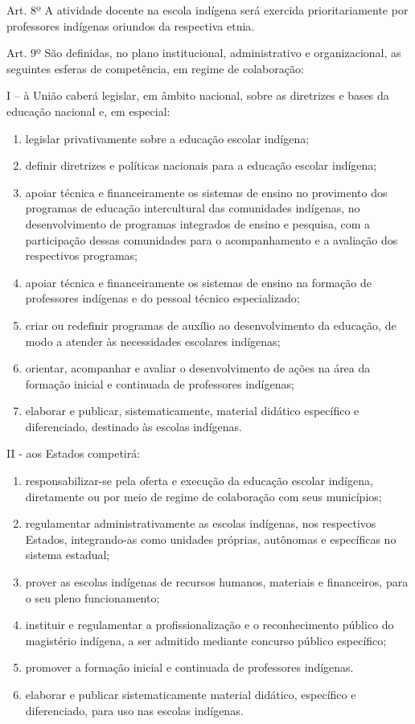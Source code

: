 \documentclass[
]{book}
\begin{document}
Art. 8º A atividade docente na escola indígena será exercida prioritariamente por professores indígenas oriundos da respectiva etnia.

Art. 9º São definidas, no plano institucional, administrativo e organizacional, as seguintes esferas de competência, em regime de colaboração:

I -- à União caberá legislar, em âmbito nacional, sobre as diretrizes e bases da educação nacional e, em especial:

\begin{enumerate}
\def\labelenumi{\alph{enumi})}
\item
  legislar privativamente sobre a educação escolar indígena;
\item
  definir diretrizes e políticas nacionais para a educação escolar indígena;
\item
  apoiar técnica e financeiramente os sistemas de ensino no provimento dos programas de educação intercultural das comunidades indígenas, no desenvolvimento de programas integrados de ensino e pesquisa, com a participação dessas comunidades para o acompanhamento e a avaliação dos respectivos programas;
\item
  apoiar técnica e financeiramente os sistemas de ensino na formação de professores indígenas e do pessoal técnico especializado;
\item
  criar ou redefinir programas de auxílio ao desenvolvimento da educação, de modo a atender às necessidades escolares indígenas;
\item
  orientar, acompanhar e avaliar o desenvolvimento de ações na área da formação inicial e continuada de professores indígenas;
\item
  elaborar e publicar, sistematicamente, material didático específico e diferenciado, destinado às escolas indígenas.
\end{enumerate}

II - aos Estados competirá:

\begin{enumerate}
\def\labelenumi{\alph{enumi})}
\item
  responsabilizar-se pela oferta e execução da educação escolar indígena, diretamente ou por meio de regime de colaboração com seus municípios;
\item
  regulamentar administrativamente as escolas indígenas, nos respectivos Estados, integrando-as como unidades próprias, autônomas e específicas no sistema estadual;
\item
  prover as escolas indígenas de recursos humanos, materiais e financeiros, para o seu pleno funcionamento;
\item
  instituir e regulamentar a profissionalização e o reconhecimento público do magistério indígena, a ser admitido mediante concurso público específico;
\item
  promover a formação inicial e continuada de professores indígenas.
\item
  elaborar e publicar sistematicamente material didático, específico e diferenciado, para uso nas escolas indígenas.
\end{enumerate}
\end{document}
